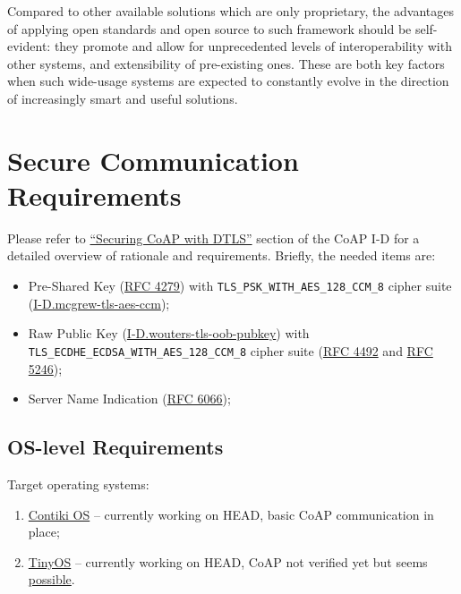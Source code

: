 \documentclass[10pt]{article}
\begin{document}
Compared to other available solutions which are only proprietary, the advantages of applying open standards and open source to such framework should be self-evident: they promote and allow for unprecedented levels of interoperability with other systems, and extensibility of pre-existing ones. These are both key factors when such wide-usage systems are expected to constantly evolve in the direction of increasingly smart and useful solutions.

\section{Secure Communication Requirements}

Please refer to \href{http://tools.ietf.org/html/draft-ietf-core-coap-08#section-10.1}{``Securing CoAP with DTLS''} section of the CoAP I-D for a detailed overview of rationale and requirements.  Briefly, the needed items are:

\begin{itemize}
\item Pre-Shared Key (\href{http://tools.ietf.org/html/rfc4279}{RFC 4279}) with \texttt{TLS\_PSK\_WITH\_AES\_128\_CCM\_8} cipher suite (\href{http://tools.ietf.org/html/draft-mcgrew-tls-aes-ccm-ecc-02}{I-D.mcgrew-tls-aes-ccm});
\item Raw Public Key (\href{http://tools.ietf.org/html/draft-wouters-tls-oob-pubkey}{I-D.wouters-tls-oob-pubkey}) with \texttt{TLS\_ECDHE\_ECDSA\_WITH\_AES\_128\_CCM\_8} cipher suite (\href{http://tools.ietf.org/html/rfc4492}{RFC 4492} and \href{http://tools.ietf.org/html/rfc5246}{RFC 5246});
\item Server Name Indication (\href{http://tools.ietf.org/html/rfc6066}{RFC 6066});
\end{itemize}

\subsection{OS-level Requirements}
Target operating systems:
\begin{enumerate}
\item\label{contiki} \href{http://www.contiki-os.org}{Contiki OS} -- currently working on HEAD, basic CoAP communication in place;
\item\label{tinyos} \href{http://www.tinyos.net}{TinyOS} -- currently working on HEAD, CoAP not verified yet but seems \href{http://zolertia.sourceforge.net/wiki/index.php/Blip_v2.0}{possible}.
\end{enumerate}
\end{document}
